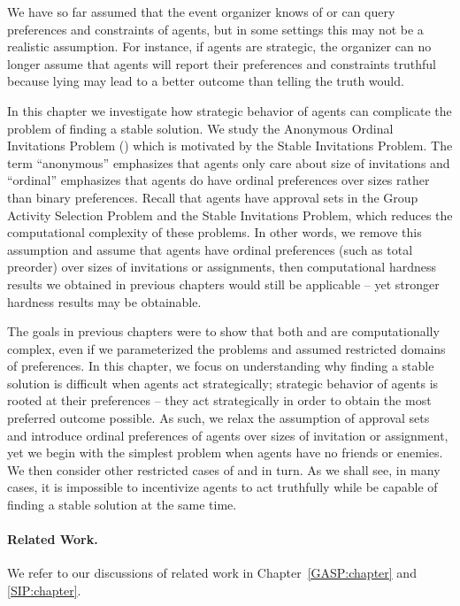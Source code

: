 \label{GT:chapter}


We have so far assumed that the event organizer knows of or can query preferences and constraints of agents, but in some settings this may not be a realistic assumption. For instance, if agents are strategic, the organizer can no longer assume that agents will report their preferences and constraints truthful because lying may lead to a better outcome than telling the truth would.

In this chapter we investigate how strategic behavior of agents can complicate the problem of finding a stable solution.
We study the Anonymous Ordinal Invitations Problem (\AOIP) which is motivated by the Stable Invitations Problem. The term ``anonymous'' emphasizes that agents only care about size of invitations and ``ordinal'' emphasizes that agents do have ordinal preferences over sizes rather than binary preferences. Recall that agents have approval sets in the Group Activity Selection Problem and the Stable Invitations Problem, which reduces the computational complexity of these problems. In other words, we remove this assumption and assume that agents have ordinal preferences (such as total preorder) over sizes of invitations or assignments, then computational hardness results we obtained in previous chapters would still be applicable -- yet stronger hardness results may be obtainable. 

The goals in previous chapters were to show that both \GASPs and \SIPs are computationally complex, even if we parameterized the problems and assumed restricted domains of preferences. In this chapter, we focus on understanding why finding a stable solution is difficult when agents act strategically; strategic behavior of agents is rooted at their preferences -- they act strategically in order to obtain the most preferred outcome possible. As such, we relax the assumption of approval sets and introduce ordinal preferences of agents over sizes of invitation or assignment, yet we begin with the simplest problem when agents have no friends or enemies. We then consider other restricted cases of \GASPs and \SIPs in turn. As we shall see, in many cases, it is impossible to incentivize agents to act truthfully while be capable of finding a stable solution at the same time.


\paragraph{Related Work.}
We refer to our discussions of related work in Chapter~\ref{GASP:chapter} and \ref{SIP:chapter}. 




